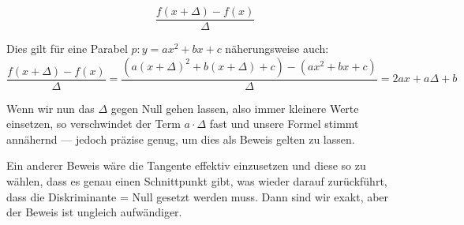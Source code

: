 
$$\frac{f(x+\Delta) - f(x)}{\Delta}$$

Dies gilt für eine Parabel $p: y=ax^2+bx+c$ näherungsweise auch:
$$\frac{f(x+\Delta)-f(x)}{\Delta} = \frac{\left(a(x+\Delta)^2 + b(x+\Delta)
  + c\right) - (ax^2 + bx +c)}{\Delta}=2ax+a\Delta+b$$

Wenn wir nun das $\Delta$ gegen Null gehen lassen, also immer kleinere
Werte einsetzen, so verschwindet der Term $a\cdot{}\Delta$ fast und unsere
Formel stimmt annähernd --- jedoch präzise genug, um dies als Beweis
gelten zu lassen.

Ein anderer Beweis wäre die Tangente effektiv einzusetzen und diese so
zu wählen, dass es genau einen Schnittpunkt gibt, was wieder darauf
zurückführt, dass die Diskriminante = Null gesetzt werden muss. Dann
sind wir exakt, aber der Beweis ist ungleich aufwändiger.
\newpage

